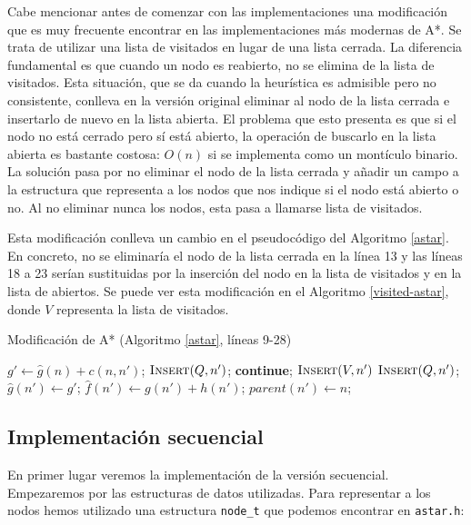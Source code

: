 \documentclass[a4paper,12pt]{article}
\begin{document}
Cabe mencionar antes de comenzar con las implementaciones una modificación que es muy frecuente encontrar en las implementaciones más modernas de A*. Se trata de utilizar una lista de visitados en lugar de una lista cerrada. La diferencia fundamental es que cuando un nodo es reabierto, no se elimina de la lista de visitados. Esta situación, que se da cuando la heurística es admisible pero no consistente, conlleva en la versión original eliminar al nodo de la lista cerrada e insertarlo de nuevo en la lista abierta. El problema que esto presenta es que si el nodo no está cerrado pero sí está abierto, la operación de buscarlo en la lista abierta es bastante costosa: $O(n)$ si se implementa como un montículo binario. La solución pasa por no eliminar el nodo de la lista cerrada y añadir un campo a la estructura que representa a los nodos que nos indique si el nodo está abierto o no. Al no eliminar nunca los nodos, esta pasa a llamarse lista de visitados.

Esta modificación conlleva un cambio en el pseudocódigo del Algoritmo \ref{astar}. En concreto, no se eliminaría el nodo de la lista cerrada en la línea 13 y las líneas 18 a 23 serían sustituidas por la inserción del nodo en la lista de visitados y en la lista de abiertos. Se puede ver esta modificación en el Algoritmo \ref{visited-astar}, donde $V$ representa la lista de visitados.

\begin{algorithm}[H]
\caption{Modificación de A* (Algoritmo \ref{astar}, líneas 9-28)}\label{visited-astar}
\begin{algorithmic}[1]
\setcounter{ALG@line}{8}
    \State $g' \gets \hat{g}(n)+c(n, n')$;
            \State $\textsc{Insert}(Q, n')$;
        \Else
            \State \textbf{continue};
        \EndIf
    \Else
        \State $\textsc{Insert}(V, n')$
        \State $\textsc{Insert}(Q, n')$;
    \EndIf
    \State $\hat{g}(n') \gets g'$;
    \State $\hat{f}(n') \gets g(n') + h(n')$;
    \State $parent(n') \gets n$;
\EndFor
\end{algorithmic}
\end{algorithm}

\subsection{Implementación secuencial}

En primer lugar veremos la implementación de la versión secuencial. Empezaremos por las estructuras de datos utilizadas. Para representar a los nodos hemos utilizado una estructura \verb|node_t| que podemos encontrar en \verb|astar.h|:
\end{document}

